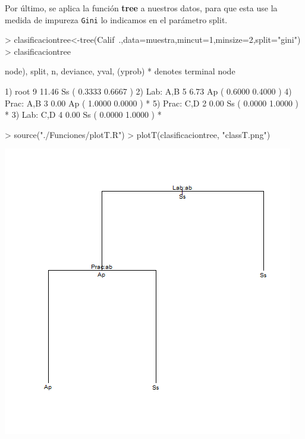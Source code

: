 \documentclass [a4paper] {article}
\begin{document}
\bigskip
Por último, se aplica la función \textbf{tree} a nuestros datos, para que esta use la medida de impureza \texttt{Gini} lo indicamos
en el parámetro split.
\begin{Schunk}
\begin{Sinput}
> clasificaciontree<-tree(Calif~.,data=muestra,mincut=1,minsize=2,split="gini")
> clasificaciontree
\end{Sinput}
\begin{Soutput}
node), split, n, deviance, yval, (yprob)
      * denotes terminal node

1) root 9 11.46 Ss ( 0.3333 0.6667 )  
  2) Lab: A,B 5  6.73 Ap ( 0.6000 0.4000 )  
    4) Prac: A,B 3  0.00 Ap ( 1.0000 0.0000 ) *
    5) Prac: C,D 2  0.00 Ss ( 0.0000 1.0000 ) *
  3) Lab: C,D 4  0.00 Ss ( 0.0000 1.0000 ) *
\end{Soutput}
\end{Schunk}

\begin{Schunk}
\begin{Sinput}
> source("./Funciones/plotT.R")
> plotT(clasificaciontree, "classT.png")
\end{Sinput}
\end{Schunk}
\includegraphics[width=\textwidth]{classT}

\end{document}

